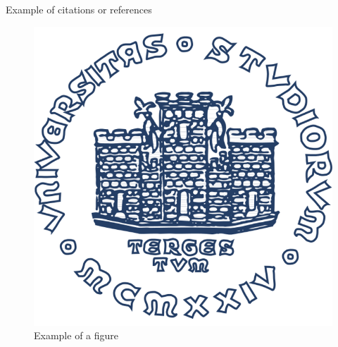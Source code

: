 Example of citations or references~\cite{einstein}\cite{latexcompanion}

\begin{figure}[h!]\label{fig:example}
\centering
\includegraphics[width=.8\textwidth]{img/units_logo.png}
\caption{Example of a figure}
\end{figure}

\lipsum[3]

